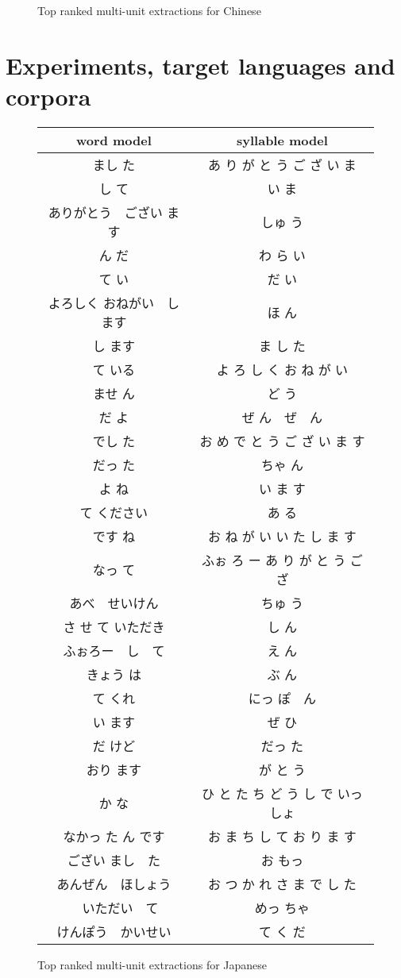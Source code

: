 \documentclass{article}
\newcommand\Japanese{\CJKfamily{jarm}\CJKnospace}
\begin{document}
\begin{figure}[ht!]
\begin{tabular}{c|c}
\end{tabular}

\label{rankingTable1}
\caption{Top ranked multi-unit extractions for Chinese}
\end{figure}


\section{Experiments, target languages and corpora}

\begin{figure*}[ht!]
\centering
\begin{tabular}{|c|c|}

\Japanese

word model&syllable model\\
\hline
まし た&

あ り が と う ご ざ い ま\\
 し て&	い ま\\
	ありがとう　ござい ます&	しゅ う\\
	ん だ&	わ ら い\\
	て い&	だ い\\
	よろしく おねがい　します&	ほ ん\\
	し ます&	ま し た\\
 	て いる&	よ ろ し く お ね が い\\
	ませ ん&	ど う\\
	だ よ&	ぜ ん　ぜ　ん\\

	でし た&	お め で と う ご ざ い ま す\\
	だっ た&	ちゃ ん\\
	よ ね&	い ま す\\
	て ください&	あ る\\
	です ね&	お ね が い い た し ま す\\
	なっ て&	ふぉ ろ ー あ り が と う ご ざ\\
あべ　せいけん&	ちゅ う\\
さ せ て いただき&	し ん\\
ふぉろー　し　て&	え ん\\
	きょう は&	ぶ ん\\
	て くれ&	にっ ぽ　ん\\
	い ます&	ぜ ひ\\
	だ けど&	だっ た\\
	おり ます&	が と う\\
	か な&	ひ と た ち ど う し で いっ しょ\\
	なかっ た ん です&	お ま ち し て お り ま す\\
		ござい まし　た&	お もっ\\
あんぜん　ほしょう&	お つ か れ さ ま で し た\\
　いただい　て&めっ ちゃ\\
けんぽう　かいせい&て く だ\\

\end{tabular}

\label{rankingTable2}
\caption{Top ranked multi-unit extractions for Japanese}
\end{figure*}
\end{document}

